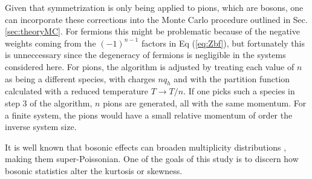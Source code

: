 Given that symmetrization is only being applied to pions, which are bosons, one can incorporate these corrections into the Monte Carlo procedure outlined in Sec. \ref{sec:theoryMC}. For fermions this might be problematic because of the negative weights coming from the $(-1)^{n-1}$ factors in Eq (\ref{eq:Zbf}), but fortunately this is unneccessary since the degeneracy of fermions is negligible in the systems considered here. For pions, the algorithm is adjusted by treating each value of $n$ as being a different species, with charges $nq_h$ and with the partition function calculated with a reduced temperature $T\rightarrow T/n$. If one picks such a species in step 3 of the algorithm, $n$ pions are generated, all with the same momentum. For a finite system, the pions would have a small relative momentum of order the inverse system size.

It is well known that bosonic effects can broaden multiplicity distributions \cite{negativebinomial}, making them super-Poissonian. One of the goals of this study is to discern how bosonic statistics alter the kurtosis or skewness. 

